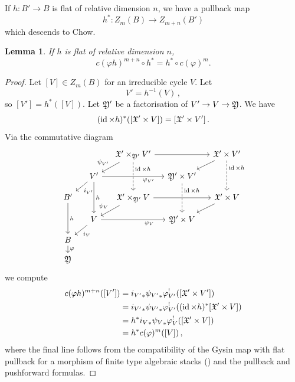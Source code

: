 \documentclass[a4paper,12pt]{article} %
\newcommand{\on}[1]{\operatorname{#1}}
\theoremstyle{definition}
\theoremstyle{plain}%
\newtheorem{lemma}[definition]{Lemma}
\renewcommand{\phi}{\varphi}
\newcommand{\Chow}{\mathsf{CH}}
\begin{document}
If $h:B'\to B$  is flat of relative dimension $n$, we have a pullback map
\[h^*\colon Z_m(B) \to Z_{m+n}(B') \]
which descends to Chow.

\begin{lemma}\label{lem:C2flat}
If $h$ is flat of relative dimension $n$,
$$c(\phi h)^{m+n} \circ h^* = h^* \circ c(\phi)^m. $$
\end{lemma} 

\begin{proof}
Let $[V] \in Z_m(B)$ for an
 irreducible cycle $V$. Let $$V' = h^{-1}(V)\, ,$$ so
$[V'] = h^*([V])$. Let $\frak Y'$ be a factorisation of $V' \to V \to \frak Y$. We have 
$$(\on{id}\times h)^*([\frak X' \times V]) = [\frak X' \times V']\, .$$ 
Via the commutative diagram
\begin{equation}
    \begin{tikzcd}[column sep=small, row sep = small]
~ & ~ & \frak X' \times_{\frak Y'} V' 	\arrow[rr] \arrow[dd, dashed, near start, "\on{id} \times h"] \arrow[dl, swap, "\psi_{V'}"] & ~ & \frak X' \times V' \arrow[dl] \arrow[dd, dashed, near start, "\on{id} \times h"]\\
~ & V' \arrow[dl, "i_{V'}"] \arrow[rr, near end, , swap, "\phi_{V'}"] \arrow[dd, "h"]& ~ & \frak Y' \times V' \arrow[dd, dashed, near start, "\on{id} \times h"] & ~ \\
 B' \arrow[dd, "h"] & ~ & \frak X' \times_{\frak Y'} V \arrow[dl, swap, "\psi_V"] 	\arrow[rr] & ~ & \frak X' \times V \arrow[dl] \\
~ & V \arrow[dl, "i_V"] \arrow[rr,swap, near end, "\phi_V"] &~ & \frak Y' \times V & ~ \\
B \arrow[d, "\phi"] &~ & ~ &~ & ~ \\
\frak Y &~ & ~ &~ & ~ 
\end{tikzcd}
\end{equation}
we compute
\begin{align*}
     c(\phi h)^{m+n} ([V']) &= {i_{V'}}_* {\psi_{V'}}_* \phi_{V'}^! ([\frak X' \times V']) \\
    &= {i_{V'}}_* {\psi_{V'}}_* \phi_{V'}^! ( (\on{id} \times h)^* [\frak X' \times V]) \\
    &= h^* {i_V}_* {\psi_V}_* \phi_V^! ( [\frak X' \times V]) \\
    &=  h^* c(\phi)^m([V])\, , 
\end{align*}
where the final line follows from the compatibility of the Gysin map with flat pullback for a morphism of finite type algebraic stacks (\cite[Section 3.1]{Kresch1999Cycle-groups-fo}) and the pullback and pushforward formulas. %
\end{proof}
\end{document}
